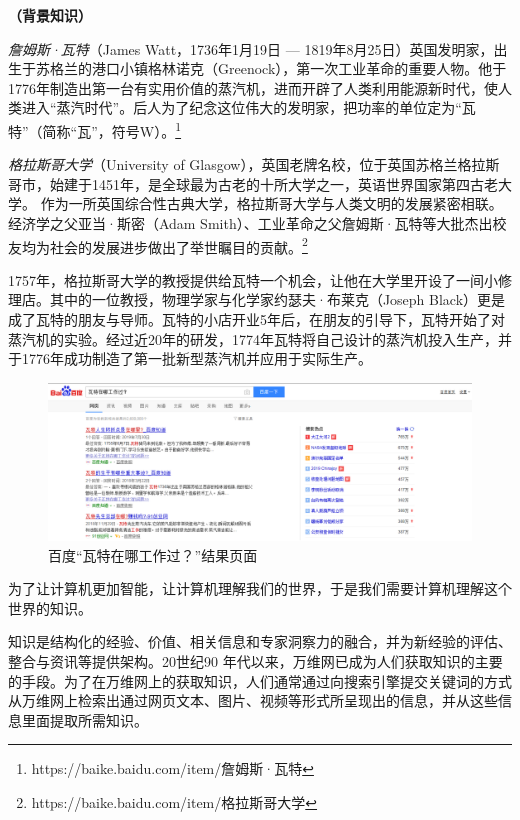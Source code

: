 \begin{example}\textbf{（背景知识）}

\emph{詹姆斯·瓦特}（James Watt，1736年1月19日 — 1819年8月25日）英国发明家，出生于苏格兰的港口小镇格林诺克（Greenock），第一次工业革命的重要人物。他于1776年制造出第一台有实用价值的蒸汽机，进而开辟了人类利用能源新时代，使人类进入“蒸汽时代”。后人为了纪念这位伟大的发明家，把功率的单位定为“瓦特”（简称“瓦”，符号W）。\footnote{https://baike.baidu.com/item/詹姆斯·瓦特}

\emph{格拉斯哥大学}（University of Glasgow），英国老牌名校，位于英国苏格兰格拉斯哥市，始建于1451年，是全球最为古老的十所大学之一，英语世界国家第四古老大学。
作为一所英国综合性古典大学，格拉斯哥大学与人类文明的发展紧密相联。经济学之父亚当·斯密（Adam Smith）、工业革命之父詹姆斯·瓦特等大批杰出校友均为社会的发展进步做出了举世瞩目的贡献。\footnote{https://baike.baidu.com/item/格拉斯哥大学}

1757年，格拉斯哥大学的教授提供给瓦特一个机会，让他在大学里开设了一间小修理店。其中的一位教授，物理学家与化学家约瑟夫·布莱克（Joseph Black）更是成了瓦特的朋友与导师。瓦特的小店开业5年后，在朋友的引导下，瓦特开始了对蒸汽机的实验。经过近20年的研发，1774年瓦特将自己设计的蒸汽机投入生产，并于1776年成功制造了第一批新型蒸汽机并应用于实际生产。
\end{example}

\begin{figure}
\begin{center}
   \includegraphics[width=12cm]{./figures/part1/baidufatherinlaw.png}
    \caption{百度“瓦特在哪工作过？”结果页面}
   \label{fig:baidufatherinlaw}
\end{center}
\end{figure}

为了让计算机更加智能，让计算机理解我们的世界，于是我们需要计算机理解这个世界的知识。


知识是结构化的经验、价值、相关信息和专家洞察力的融合，并为新经验的评估、整合与资讯等提供架构\cite{url:KnowledgeDef}。20世纪90 年代以来，万维网已成为人们获取知识的主要的手段\cite{article:Internet}。为了在万维网上的获取知识，人们通常通过向搜索引擎提交关键词的方式从万维网上检索出通过网页文本、图片、视频等形式所呈现出的信息，并从这些信息里面提取所需知识。


